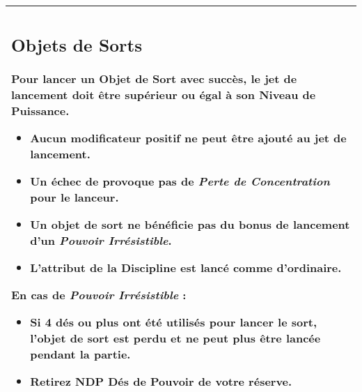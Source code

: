 \documentclass[a4paper,8pt]{extarticle}
\begin{document}
\begin{minipage}[t]{.5\linewidth}
\begin{tabular}{|m{8cm}|}
\subsection*{Objets de Sorts}
\noindent Pour lancer un Objet de Sort avec succès, le jet de lancement doit être supérieur ou égal à son Niveau de Puissance.
\smallskip
\begin{itemize}
\item Aucun modificateur positif ne peut être ajouté au jet de lancement.
\item Un échec de provoque pas de \emph{Perte de Concentration} pour le lanceur.
\item Un objet de sort ne bénéficie pas du bonus de lancement d'un \emph{Pouvoir Irrésistible}.
\item L'attribut de la Discipline est lancé comme d'ordinaire.
\end{itemize}
\medskip En cas de \emph{Pouvoir Irrésistible} :
\smallskip
\begin{itemize}
\item Si 4 dés ou plus ont été utilisés pour lancer le sort, l'objet de sort est perdu et ne peut plus être lancée pendant la partie.
\item Retirez NDP Dés de Pouvoir de votre réserve.
\end{itemize}
\tabularnewline
\hline
\end{tabular}

\end{minipage}
\end{document}
